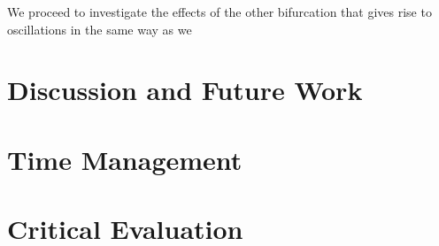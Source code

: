 \documentclass[12pt,a4paper,titlepage]{article}
\begin{document}
We proceed to investigate the effects of the other bifurcation that gives rise to oscillations in the same way as we

%







\section{Discussion and Future Work}

\newpage

\appendix
\section{Time Management}
\section{Critical Evaluation}
\end{document}
